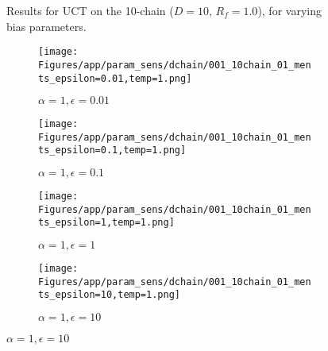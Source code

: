 \documentclass{article}
\theoremstyle{plain}
\begin{document}
\begin{appendices}
\begin{figure}
                \caption{Results for UCT on the 10-chain ($D=10$, $R_f=1.0$), for varying bias parameters.}
                \label{fig:uct_10chain_hps}
            \end{figure}


            \begin{figure}
                \centering
                
                \begin{subfigure}[b]{0.24\textwidth}
                    \centering
                    \texttt{[image: Figures/app/param\_sens/dchain/001\_10chain\_01\_ments\_epsilon=0.01,temp=1.png]}
                    \caption*{$\alpha=1,\epsilon=0.01$}
                \end{subfigure}
                \begin{subfigure}[b]{0.24\textwidth}
                    \centering
                    \texttt{[image: Figures/app/param\_sens/dchain/001\_10chain\_01\_ments\_epsilon=0.1,temp=1.png]}
                    \caption*{$\alpha=1,\epsilon=0.1$}
                \end{subfigure}
                \begin{subfigure}[b]{0.24\textwidth}
                    \centering
                    \texttt{[image: Figures/app/param\_sens/dchain/001\_10chain\_01\_ments\_epsilon=1,temp=1.png]}
                    \caption*{$\alpha=1,\epsilon=1$}
                \end{subfigure}
                \begin{subfigure}[b]{0.24\textwidth}
                    \centering
                    \texttt{[image: Figures/app/param\_sens/dchain/001\_10chain\_01\_ments\_epsilon=10,temp=1.png]}
                    \caption*{$\alpha=1,\epsilon=10$}
                \end{subfigure}
                

\end{figure}
\end{appendices}
\end{document}

